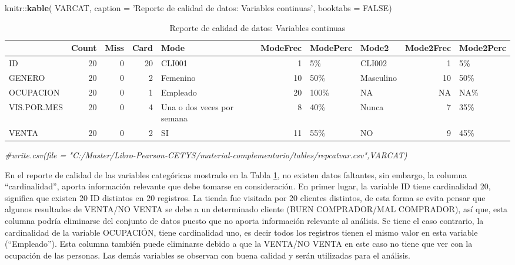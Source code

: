 \documentclass[]{book}
\newenvironment{Shaded}{\begin{snugshade}}{\end{snugshade}}
\newcommand{\KeywordTok}[1]{\textcolor[rgb]{0.13,0.29,0.53}{\textbf{{#1}}}}
\newcommand{\DataTypeTok}[1]{\textcolor[rgb]{0.13,0.29,0.53}{{#1}}}
\newcommand{\StringTok}[1]{\textcolor[rgb]{0.31,0.60,0.02}{{#1}}}
\newcommand{\CommentTok}[1]{\textcolor[rgb]{0.56,0.35,0.01}{\textit{{#1}}}}
\newcommand{\OtherTok}[1]{\textcolor[rgb]{0.56,0.35,0.01}{{#1}}}
\newcommand{\NormalTok}[1]{{#1}}
\begin{document}
\begin{Shaded}
\begin{Highlighting}[]
\NormalTok{knitr::}\KeywordTok{kable}\NormalTok{(}
  \NormalTok{VARCAT, }\DataTypeTok{caption =} \StringTok{'Reporte de calidad de datos: Variables continuas'}\NormalTok{,}
  \DataTypeTok{booktabs =} \OtherTok{FALSE}\NormalTok{)}
\end{Highlighting}
\end{Shaded}

\begin{table}

\caption{\label{tab:reporte-de-calidad-varcat}Reporte de calidad de datos: Variables continuas}
\centering
\begin{tabular}[t]{l|r|r|r|l|r|l|l|r|l}
\hline
  & Count & Miss & Card & Mode & ModeFrec & ModePerc & Mode2 & Mode2Frec & Mode2Perc\\
\hline
ID & 20 & 0 & 20 & CLI001 & 1 & 5\% & CLI002 & 1 & 5\%\\
\hline
GENERO & 20 & 0 & 2 & Femenino & 10 & 50\% & Masculino & 10 & 50\%\\
\hline
OCUPACION & 20 & 0 & 1 & Empleado & 20 & 100\% & NA & NA & NA\%\\
\hline
VIS.POR.MES & 20 & 0 & 4 & Una o dos veces por semana & 8 & 40\% & Nunca & 7 & 35\%\\
\hline
VENTA & 20 & 0 & 2 & SI & 11 & 55\% & NO & 9 & 45\%\\
\hline
\end{tabular}
\end{table}

\begin{Shaded}
\begin{Highlighting}[]
\CommentTok{#write.csv(file = "C:/Master/Libro-Pearson-CETYS/material-complementario/tables/repcatvar.csv",VARCAT)}
\end{Highlighting}
\end{Shaded}

En el reporte de calidad de las variables categóricas mostrado en la
Tabla \ref{tab:reporte-de-calidad-varcat}, no existen datos faltantes,
sin embargo, la columna ``cardinalidad'', aporta información relevante
que debe tomarse en consideración. En primer lugar, la variable ID tiene
cardinalidad 20, significa que existen 20 ID distintos en 20 registros.
La tienda fue visitada por 20 clientes distintos, de esta forma se evita
pensar que algunos resultados de VENTA/NO VENTA se debe a un determinado
cliente (BUEN COMPRADOR/MAL COMPRADOR), así que, esta columna podría
eliminarse del conjunto de datos puesto que no aporta información
relevante al análisis. Se tiene el caso contrario, la cardinalidad de la
variable OCUPACIÓN, tiene cardinalidad uno, es decir todos los registros
tienen el mismo valor en esta variable (``Empleado''). Esta columna
también puede eliminarse debido a que la VENTA/NO VENTA en este caso no
tiene que ver con la ocupación de las personas. Las demás variables se
observan con buena calidad y serán utilizadas para el análisis.
\end{document}
